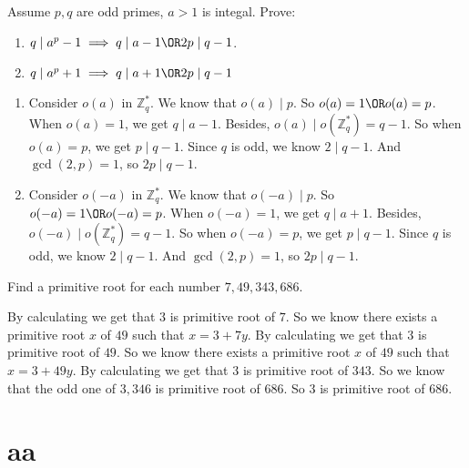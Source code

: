\documentclass{ctexart}
\newif\ifpreface
\begin{document}
\large
\setlength{\baselineskip}{1.2em}
\ifpreface
  
  \newgeometry{left=2cm,right=2cm,top=2cm,bottom=2cm}
\else
  \maketitle \fi
\begin{problem}\label{pro:1}
  Assume \(p,q\) are odd primes, \(a > 1\) is integal.
  Prove:
  \begin{enumerate}
    \item \(q \mid a^p-1 \implies q \mid a-1 \OR 2p \mid q-1\).
    \item \(q \mid a^p +1\implies q \mid a+1 \OR 2p \mid q-1\)
  \end{enumerate}
\end{problem}
\begin{solution}
  \begin{enumerate}
    \item Consider \(o(a)\) in \(\mathbb{Z}_q^{*}\). We know that \(o(a) \mid p\).
      So \(o(a)=1 \OR o(a) = p\). When \(o(a)=1\), we get \(q \mid a-1\).
      Besides, \(o(a) \mid o(\mathbb{Z}_q^{*})=q-1\).
      So when \(o(a)=p\), we get \(p \mid q-1\).
      Since \(q\) is odd, we know \(2 \mid q-1\). And \(\gcd(2,p)=1\), so \(2p \mid q-1\).
    \item Consider \(o(-a)\) in \(\mathbb{Z}_q^{*}\). We know that \(o(-a) \mid p\).
      So \(o(-a)=1 \OR o(-a) = p\). When \(o(-a)=1\), we get \(q \mid a+1\).
      Besides, \(o(-a) \mid o(\mathbb{Z}_q^{*})=q-1\).
      So when \(o(-a)=p\), we get \(p \mid q-1\).
      Since \(q\) is odd, we know \(2 \mid q-1\). And \(\gcd(2,p)=1\), so \(2p \mid q-1\).
  \end{enumerate}
\end{solution}

\begin{problem}\label{pro:2}
  Find a primitive root for each number \(7,49,343,686\).
\end{problem}
\begin{solution}
  By calculating we get that \(3\) is primitive root of \(7\).
  So we know there exists a primitive root \(x\) of \(49\) such that \(x=3+7y\).
  By calculating we get that \(3\) is primitive root of \(49\).
  So we know there exists a primitive root \(x\) of \(49\) such that \(x=3+49y\).
  By calculating we get that \(3\) is primitive root of \(343\).
  So we know that the odd one of \(3,346\) is primitive root of \(686\).
  So \(3\) is primitive root of \(686\).
\end{solution}
\section{aa}
\end{document}
